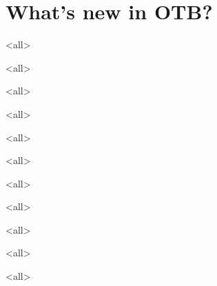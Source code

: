 \section{What's new in OTB?}

\mode<all>


\mode<all>


\mode<all>


\mode<all>


\mode<all>


\mode<all>


\mode<all>


\mode<all>


\mode<all>


\mode<all>


\mode<all>












